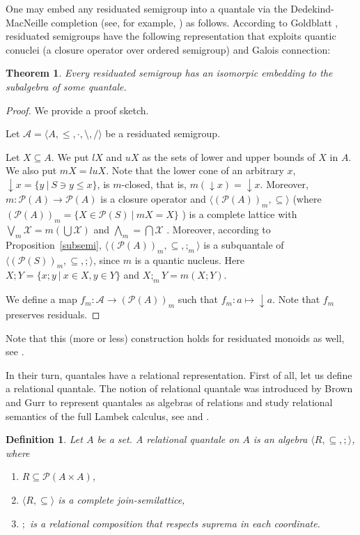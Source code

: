 \documentclass[a4paper]{article}
\theoremstyle{defin}
\newtheorem{defin}{Definition}
\theoremstyle{theorem}
\newtheorem{theorem}{Theorem}
\theoremstyle{prop}
\theoremstyle{lemma}
\theoremstyle{ex}
\theoremstyle{col}
\theoremstyle{claim}
\begin{document}
One may embed any residuated semigroup into a quantale via the Dedekind-MacNeille completion (see, for example, \cite{theunissen2007macneille}) as follows. According to Goldblatt \cite{goldblatt2006kripke}, residuated semigroups have the following representation that exploits quantic conuclei (a closure operator over ordered semigroup) and Galois connection:
\begin{theorem} \label{orsRep}
  Every residuated semigroup has an isomorpic embedding to the subalgebra of some quantale.
\end{theorem}
\begin{proof}
  We provide a proof sketch.

  Let $\mathcal{A} = \langle A, \leq, \cdot, \setminus, / \rangle$ be a residuated semigroup.

  Let $X \subseteq A$. We put $lX$ and $uX$ as the sets of lower and upper bounds of $X$ in $A$. We also put $m X = lu X$.
  Note that the lower cone of an arbitrary $x$, $\downarrow x = \{ y \: | \: S \ni y \leq x\}$, is $m$-closed, that is,
  $m (\downarrow x) = \downarrow x$. Moreover, $m : \mathcal{P}(A) \to \mathcal{P}(A)$ is a closure operator and
  $\langle (\mathcal{P}(A))_m, \subseteq \rangle$ (where $(\mathcal{P}(A))_m = \{ X \in \mathcal{P}(S) \: | \: m X = X\}$ ) is a complete
  lattice with $\bigvee_{m} \mathcal{X} = m ( \bigcup \mathcal{X})$ and $\bigwedge_{m} = \bigcap \mathcal{X}$ \cite{davey2002introduction}.
  Moreover, according to Proposition~\ref{subsemi}, $\langle (\mathcal{P}(A))_m, \subseteq, ;_m \rangle$ is a subquantale of
  $\langle (\mathcal{P}(S))_m, \subseteq, ; \rangle$, since $m$ is a quantic nucleus. Here $X ; Y = \{ x ; y \: | \: x \in X, y \in Y \}$ and $X ;_m Y = m (X ; Y)$.

  We define a map $f_m : \mathcal{A} \to (\mathcal{P}(A))_m$ such that $f_m : a \mapsto \downarrow a$. Note that $f_m$ preserves residuals.
\end{proof}

Note that this (more or less) construction holds for residuated monoids as well, see \cite{goldblatt2011grishin}.

In their turn, quantales have a relational representation. First of all, let us define a relational quantale.
The notion of relational quantale was introduced by Brown and Gurr to represent quantales as algebras of relations and study relational semantics of the full Lambek calculus, see \cite{brown1993representation} and \cite{brown1995relations}.
\begin{defin}
  Let $A$ be a set. A relational quantale on $A$ is an algebra $\langle R, \subseteq, ; \rangle$, where
  \begin{enumerate}
    \item $R \subseteq \mathcal{P}(A \times A)$,
    \item $\langle R, \subseteq \rangle$ is a complete join-semilattice,
    \item $;$ is a relational composition that respects suprema in each coordinate.
  \end{enumerate}
\end{defin}
\end{document}
